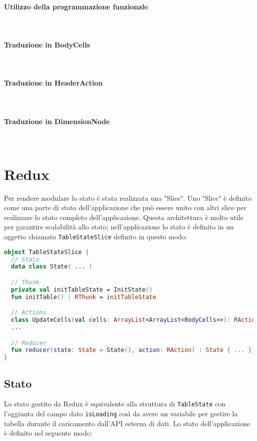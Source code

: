 \paragraph{Utilizzo della programmazione funzionale} \mbox{} \\

\paragraph{Traduzione in BodyCells}\mbox{} \\


\paragraph{Traduzione in HeaderAction}\mbox{} \\


\paragraph{Traduzione in DimensionNode}\mbox{} \\


\section{Redux}
Per rendere modulare lo stato è stata realizzata una "Slice". Uno "Slice" è definito come una parte di stato dell'applicazione che può essere unito con altri slice per realizzare lo stato completo dell'applicazione. Questa architettura è molto utile per garantire scalabilità allo stato; nell'applicazione lo stato è definito in un oggetto chiamato \verb|TableStateSlice| definito in questo modo:
\begin{lstlisting}[caption={TableStateSlice}, label={lst:bodycells}, language=Kotlin]
object TableStateSlice {
  // Stato
  data class State( ... )

  // Thunk
  private val initTableState = InitState()
  fun initTable() : RThunk = initTableState

  // Actions
  class UpdateCells(val cells: ArrayList<ArrayList<BodyCells>>): RAction
  ...

  // Reducer
  fun reducer(state: State = State(), action: RAction) : State { ... }
}

\end{lstlisting}

\subsection{Stato}
Lo stato gestito da Redux è equivalente alla struttura di \verb|TableState| con l'aggiunta del campo dato \verb|isLoading| così da avere un variabile per gestire la tabella durante il caricamento dall'API esterna di dati. Lo stato dell'applicazione è definito nel seguente modo:

